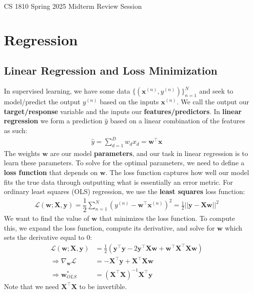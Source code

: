 \documentclass[11pt, letterpaper]{article}
\theoremstyle{definition}
\theoremstyle{plain}
\begin{document}
\begin{center}
{\LARGE CS 1810 Spring 2025 Midterm Review Session}\\
\end{center}

\section{Regression}

\subsection{Linear Regression and Loss Minimization}

In supervised learning, we have some data $\{ (\bm x^{(n)}, y^{(n)}) \}_{n=1}^N$ and seek to model/predict the output $y^{(n)}$ based on the inputs $\bm x^{(n)}$. We call the output our \textbf{target/response} variable and the inputs our \textbf{features/predictors}. In \textbf{linear regression} we form a prediction $\hat y$ based on a linear combination of the features as such:
\begin{align*}
    \hat y = \sum_{d=1}^D w_d x_d = \bm{w}^\top\bm{x}
\end{align*}
The weights $\bm w$ are our model \textbf{parameters}, and our task in linear regression is to learn these parameters. To solve for the optimal parameters, we need to define a \textbf{loss function} that depends on $\bm w$. The loss function captures how well our model fits the true data through outputting what is essentially an error metric. For ordinary least squares (OLS) regression, we use the \textbf{least squares} loss function:
\begin{align*}
    \mathcal{L}(\bm w; \bm{X}, \bm{y}) = \dfrac{1}{2}\sum_{n=1}^N\left(y^{(n)} - \bm{w}^\top\bm{x}^{(n)} \right)^2 = \frac{1}{2}||\bm y - \bm X \bm w||^2
\end{align*}
We want to find the value of $\bm w$ that minimizes the loss function. To compute this, we expand the loss function, compute its derivative, and solve for $\bm w$ which sets the derivative equal to 0:
\begin{align*}
    \mathcal{L}(\bm w; \bm{X}, \bm{y}) &= \frac{1}{2}\left(\bm{y}^\top\bm{y} - 2\bm{y}^\top\bm{X}\bm{w} + \bm{w}^\top\bm{X}^\top\bm{X}\bm{w} \right) \\
    \Longrightarrow \nabla_{\bm w}\mathcal{L} &= -\bm{X}^\top\bm{y} + \bm{X}^\top\bm{X}\bm{w} \\
    \Longrightarrow \bm{w}^*_{OLS} &= (\bm{X}^\top\bm{X})^{-1}\bm{X}^\top\bm{y}
\end{align*}
Note that we need $\bm{X}^\top\bm{X}$ to be invertible.
\end{document}
